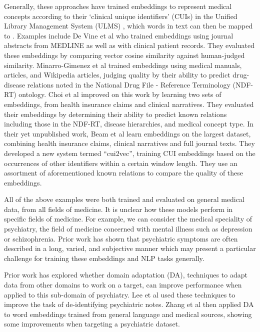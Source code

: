 \documentclass[10pt]{article}
\begin{document}
Generally, these approaches have trained embeddings to represent medical concepts according to their `clinical unique identifiers' (CUIs) in the Unified Library Management System (ULMS) \cite{bodenreiderUnifiedMedicalLanguage2004}, which words in text can then be mapped to \cite{yuShortIntroductionNILE2013}. Examples include De Vine et al  who trained embeddings using journal abstracts from MEDLINE as well as with clinical patient records. They evaluated these embeddings by comparing vector cosine similarity against human-judged similarity. Minarro-Gimenez et al  trained embeddings using medical manuals, articles, and Wikipedia articles, judging quality by their ability to predict drug-disease relations noted in the National Drug File - Reference Terminology (NDF-RT) ontology. Choi et al \cite{choiLearningLowDimensionalRepresentations2016} improved on this work by learning two sets of embeddings, from health insurance claims and clinical narratives. They evaluated their embeddings by determining their ability to predict known relations including those in the NDF-RT, disease hierarchies, and medical concept type. In their yet unpublished work, Beam et al \cite{beamClinicalConceptEmbeddings2018} learn embeddings on the largest dataset, combining health insurance claims, clinical narratives and full journal texts. They developed a new system termed ``cui2vec'', training CUI embeddings based on the occurrences of other identifiers within a certain window length. They use an assortment of aforementioned known relations to compare the quality of these embeddings. 

All of the above examples were both trained and evaluated on general medical data, from all fields of medicine. It is unclear how these models perform in specific fields of medicine. For example, we can consider the medical speciality of psychiatry, the field of medicine concerned with mental illness such as depression or schizophrenia. Prior work has shown that psychiatric symptoms are often described in a long, varied, and subjective manner \cite{forbushSittingPinsNeedles2013} which may present a particular challenge for training these embeddings and NLP tasks generally.

Prior work has explored whether domain adaptation (DA), techniques to adapt data from other domains to work on a target, can improve performance when applied to this sub-domain of psychiatry. Lee et al \cite{leeLeveragingExistingCorpora2018} used these techniques to improve the task of de-identifying psychiatric notes. Zhang et al \cite{zhangAdaptingWordEmbeddings2018} then applied DA to word embeddings trained from general language and medical sources, showing some improvements when targeting a psychiatric dataset. 
\end{document}
